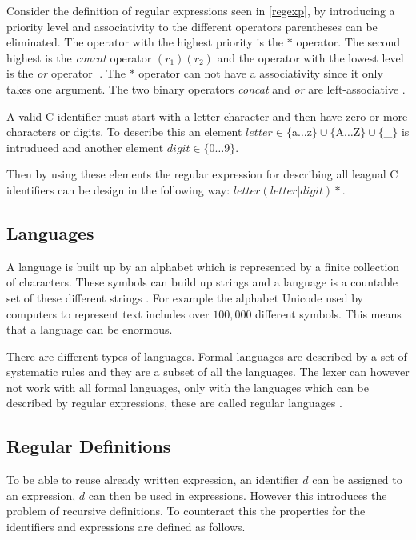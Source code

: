 Consider the definition of regular expressions seen in \cref{regexp},
by introducing a priority level and associativity to the different operators
parentheses can be eliminated. The operator with the highest priority is the $*$
operator. The second highest is the \emph{concat} operator $(r_1)(r_2)$ and the
operator with the lowest level is the \emph{or} operator $|$. The $*$ operator
can not have a associativity since it only takes one argument. The two
binary operators \emph{concat} and \emph{or} are left-associative
\cite{Aho1990}.
\newline
\begin{example}\label{regexpEx}
A valid C identifier must start with a letter character and then have zero or more characters or digits. To describe this an element $letter
\in \{$a$ \dots $z$\} \cup \{$A$ \dots $Z$\} \cup \{$\_$\}$ is intruduced and
another element $digit \in \{0 \dots 9\}$.

Then by using these elements the regular expression for describing all leagual C
identifiers can be design in the following way: $letter (letter | digit)*$.
\end{example}

\subsection{Languages}
A language is built up by an alphabet which is represented by a finite
collection of characters. These symbols can build up strings and a language is
a countable set of these different strings \cite{Aho2006}. For example the
alphabet Unicode used by computers to represent text includes over $100,000$
different symbols. This means that a language can be enormous.

There are different types of languages. Formal languages are described by a set
of systematic rules and they are a subset of all the languages. The lexer can
however not work with all formal languages, only
with the languages which can be described by regular expressions, these are
called regular languages \cite{Ranta2012}.

\subsection{Regular Definitions}
To be able to reuse already written expression, an identifier $d$ can be
assigned to an expression, $d$ can then be used in expressions. However
this introduces the problem of recursive definitions. To counteract this
the properties for the identifiers and expressions are defined as follows.

